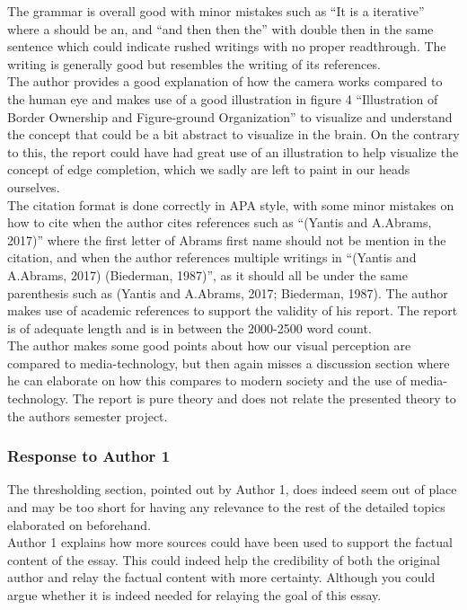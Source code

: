 \documentclass{article}
\begin{document}
The grammar is overall good with minor mistakes such as “It is a iterative” where a should be an, and “and then then the” with double then in the same sentence which could indicate rushed writings with no proper readthrough. The writing is generally good but resembles the writing of its references.\\

The author provides a good explanation of how the camera works compared to the human eye and makes use of a good illustration in figure 4 “Illustration of Border Ownership and Figure-ground Organization” to visualize and understand the concept that could be a bit abstract to visualize in the brain. On the contrary to this, the report could have had great use of an illustration to help visualize the concept of edge completion, which we sadly are left to paint in our heads ourselves.\\

The citation format is done correctly in APA style, with some minor mistakes on how to cite when the author cites references such as “(Yantis and A.Abrams, 2017)” where the first letter of Abrams first name should not be mention in the citation, and when the author references multiple writings in “(Yantis and A.Abrams, 2017) (Biederman, 1987)”, as it should all be under the same parenthesis such as (Yantis and A.Abrams, 2017; Biederman, 1987). The author makes use of academic references to support the validity of his report. The report is of adequate length and is in between the 2000-2500 word count.\\

The author makes some good points about how our visual perception are compared to media-technology, but then again misses a discussion section where he can elaborate on how this compares to modern society and the use of media-technology. The report is pure theory and does not relate the presented theory to the authors semester project.\\

\subsubsection{Response to Author 1}
The thresholding section, pointed out by Author 1, does indeed seem out of place and may be too short for having any relevance to the rest of the detailed topics elaborated on beforehand.\\

Author 1 explains how more sources could have been used to support the factual content of the essay. This could indeed help the credibility of both the original author and relay the factual content with more certainty. Although you could argue whether it is indeed needed for relaying the goal of this essay.\\
\end{document}
